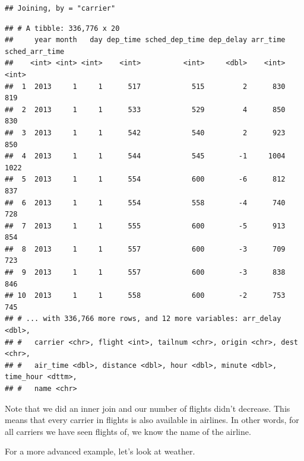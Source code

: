 \documentclass[]{tufte-book}
\newenvironment{Shaded}{}{}
\newcommand{\KeywordTok}[1]{\textcolor[rgb]{0.00,0.44,0.13}{\textbf{#1}}}
\newcommand{\NormalTok}[1]{#1}
\newcommand{\OperatorTok}[1]{\textcolor[rgb]{0.40,0.40,0.40}{#1}}
\newcommand{\StringTok}[1]{\textcolor[rgb]{0.25,0.44,0.63}{#1}}
\begin{document}
\begin{Shaded}
\end{Shaded}

\begin{verbatim}
## Joining, by = "carrier"
\end{verbatim}

\begin{verbatim}
## # A tibble: 336,776 x 20
##     year month   day dep_time sched_dep_time dep_delay arr_time sched_arr_time
##    <int> <int> <int>    <int>          <int>     <dbl>    <int>          <int>
##  1  2013     1     1      517            515         2      830            819
##  2  2013     1     1      533            529         4      850            830
##  3  2013     1     1      542            540         2      923            850
##  4  2013     1     1      544            545        -1     1004           1022
##  5  2013     1     1      554            600        -6      812            837
##  6  2013     1     1      554            558        -4      740            728
##  7  2013     1     1      555            600        -5      913            854
##  8  2013     1     1      557            600        -3      709            723
##  9  2013     1     1      557            600        -3      838            846
## 10  2013     1     1      558            600        -2      753            745
## # ... with 336,766 more rows, and 12 more variables: arr_delay <dbl>,
## #   carrier <chr>, flight <int>, tailnum <chr>, origin <chr>, dest <chr>,
## #   air_time <dbl>, distance <dbl>, hour <dbl>, minute <dbl>, time_hour <dttm>,
## #   name <chr>
\end{verbatim}

Note that we did an inner join and our number of flights didn't decrease. This means that every carrier in flights is also available in airlines. In other words, for all carriers we have seen flights of, we know the name of the airline.

For a more advanced example, let's look at weather.

\begin{Shaded}
\end{Shaded}
\end{document}
